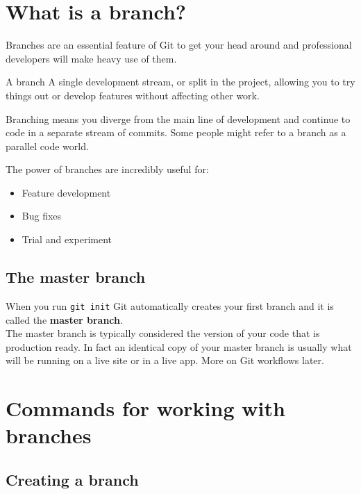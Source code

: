 \section{What is a branch?}

Branches are an essential feature of Git to get your head around and professional developers will make heavy use of them.
\\

\begin{infobox}{A branch}
	A single development stream, or split in the project, allowing you to try things out or develop features without affecting other work.
\end{infobox}

Branching means you diverge from the main line of development and continue to code in a separate stream of commits. Some people might refer to a branch as a parallel code world.
\\



The power of branches are incredibly useful for:
\begin{itemize}
    \item Feature development
    \item Bug fixes
    \item Trial and experiment
\end{itemize}

\subsection{The master branch}

When you run \texttt{git init} Git automatically creates your first branch and it is called the \textbf{master branch}.
\\

The master branch is typically considered the version of your code that is production ready. In fact an identical copy of your master branch is usually what will be running on a live site or in a live app. More on Git workflows later.
\\

\section{Commands for working with branches}


\subsection{Creating a branch}

